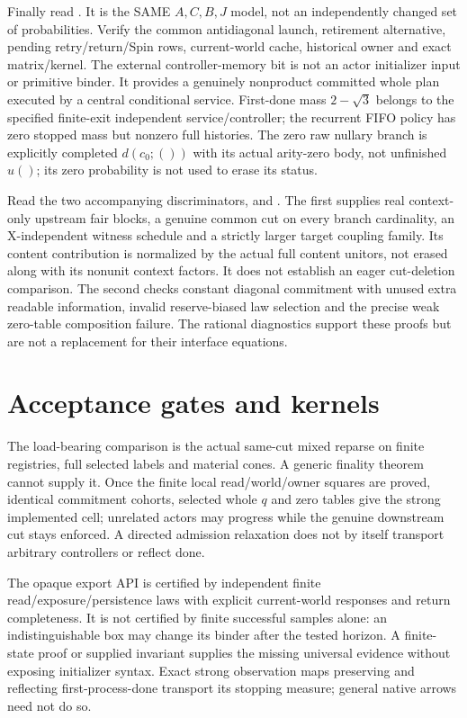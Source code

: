 \documentclass{article}
\begin{document}
Finally read  . It is the SAME $A,C,B,J$ model, not an independently changed set of probabilities. Verify the common antidiagonal launch, retirement alternative, pending retry/return/Spin rows, current-world cache, historical owner and exact matrix/kernel. The external controller-memory bit is not an actor initializer input or primitive binder. It provides a genuinely nonproduct committed whole plan executed by a central conditional service. First-done mass $2-\sqrt3$ belongs to the specified finite-exit independent service/controller; the recurrent FIFO policy has zero stopped mass but nonzero full histories. The zero raw nullary branch is explicitly completed $d(c_0;())$ with its actual arity-zero body, not unfinished $u()$; its zero probability is not used to erase its status.

Read the two accompanying discriminators,  and . The first supplies real context-only upstream fair blocks, a genuine common cut on every branch cardinality, an X-independent witness schedule and a strictly larger target coupling family. Its content contribution is normalized by the actual full content unitors, not erased along with its nonunit context factors. It does not establish an eager cut-deletion comparison. The second checks constant diagonal commitment with unused extra readable information, invalid reserve-biased law selection and the precise weak zero-table composition failure. The rational diagnostics support these proofs but are not a replacement for their interface equations.

\section{Acceptance gates and kernels}
The load-bearing comparison is the actual same-cut mixed reparse on finite registries, full selected labels and material cones. A generic finality theorem cannot supply it. Once the finite local read/world/owner squares are proved, identical commitment cohorts, selected whole $q$ and zero tables give the strong implemented cell; unrelated actors may progress while the genuine downstream cut stays enforced. A directed admission relaxation does not by itself transport arbitrary controllers or reflect done.

The opaque export API is certified by independent finite read/exposure/persistence laws with explicit current-world responses and return completeness. It is not certified by finite successful samples alone: an indistinguishable box may change its binder after the tested horizon. A finite-state proof or supplied invariant supplies the missing universal evidence without exposing initializer syntax. Exact strong observation maps preserving and reflecting first-process-done transport its stopping measure; general native arrows need not do so.
\end{document}
